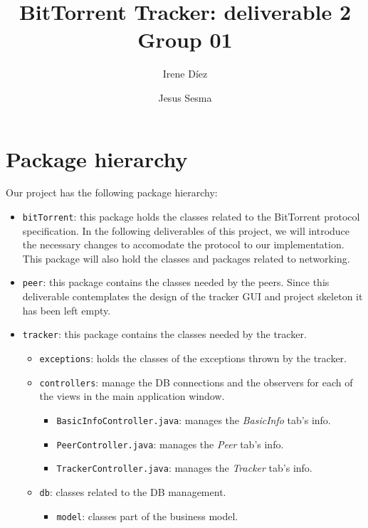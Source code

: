 \documentclass[twoside,a4paper,10pt]{article}
\title{BitTorrent Tracker: deliverable 2\\
  Group 01}
\author{Irene Díez \and Jesus Sesma}
\begin{document}
\date{}
\maketitle

\section{Package hierarchy}\label{sec:pa-hierarchy}

Our project has the following package hierarchy:

\begin{itemize}
\item \texttt{bitTorrent}: this package holds the classes related to the
  BitTorrent protocol specification. In the following deliverables of this
  project, we will introduce the necessary changes to accomodate the protocol
  to our implementation.
  This package will also hold the classes and packages related to networking.
\item \texttt{peer}: this package contains the classes needed by the peers. 
  Since this deliverable contemplates the design of the tracker GUI and
  project skeleton it has been left empty.
\item \texttt{tracker}: this package contains the classes needed by the tracker.
  \begin{itemize}
  \item \texttt{exceptions}: holds the classes of the exceptions thrown by the
    tracker.
  \item \texttt{controllers}: manage the DB connections and the observers for
    each of the views in the main application window.
    \begin{itemize}
    \item \texttt{BasicInfoController.java}:
      manages the \emph{BasicInfo} tab's info.
    \item \texttt{PeerController.java}:
      manages the \emph{Peer} tab's info.
    \item \texttt{TrackerController.java}:
      manages the \emph{Tracker} tab's info.
    \end{itemize}
  \item \texttt{db}: classes related to the DB management.
    \begin{itemize}
    \item \texttt{model}: classes part of the business model.
      \begin{itemize}

\end{itemize}
\end{itemize}
\end{itemize}
\end{itemize}
\end{document}

